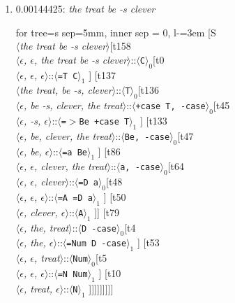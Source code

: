 \documentclass[11pt]{article}
\begin{document}
\begin{enumerate}
	\item  0.00144425: \textit{the treat be -s clever} \\[0.5em]
	\begin{forest}
	for tree={s sep=5mm, inner sep = 0, l-=3em}
	[S\\$\langle$\textit{the treat be -s clever}$\rangle$[t158\\$\langle$\textit{$\epsilon${,} $\epsilon${,} the treat be -s clever}$\rangle$::$\langle$\texttt{C}$\rangle_0$[t0\\$\langle$\textit{$\epsilon${,} $\epsilon${,} $\epsilon$}$\rangle$::$\langle$\texttt{{=}T C}$\rangle_1$ ] [t137\\$\langle$\textit{the treat{,} be -s{,} clever}$\rangle$::$\langle$\texttt{T}$\rangle_0$[t136\\$\langle$\textit{$\epsilon${,} be -s{,} clever{,} the treat}$\rangle$::$\langle$\texttt{+case T{,} -case}$\rangle_0$[t45\\$\langle$\textit{$\epsilon${,} -s{,} $\epsilon$}$\rangle$::$\langle$\texttt{{=}$>$Be +case T}$\rangle_1$ ] [t133\\$\langle$\textit{$\epsilon${,} be{,} clever{,} the treat}$\rangle$::$\langle$\texttt{Be{,} -case}$\rangle_0$[t47\\$\langle$\textit{$\epsilon${,} be{,} $\epsilon$}$\rangle$::$\langle$\texttt{{=}a Be}$\rangle_1$ ] [t86\\$\langle$\textit{$\epsilon${,} $\epsilon${,} clever{,} the treat}$\rangle$::$\langle$\texttt{a{,} -case}$\rangle_0$[t64\\$\langle$\textit{$\epsilon${,} $\epsilon${,} clever}$\rangle$::$\langle$\texttt{{=}D a}$\rangle_0$[t48\\$\langle$\textit{$\epsilon${,} $\epsilon${,} $\epsilon$}$\rangle$::$\langle$\texttt{{=}A {=}D a}$\rangle_1$ ] [t50\\$\langle$\textit{$\epsilon${,} clever{,} $\epsilon$}$\rangle$::$\langle$\texttt{A}$\rangle_1$ ]] [t79\\$\langle$\textit{$\epsilon${,} the{,} treat}$\rangle$::$\langle$\texttt{D -case}$\rangle_0$[t4\\$\langle$\textit{$\epsilon${,} the{,} $\epsilon$}$\rangle$::$\langle$\texttt{{=}Num D -case}$\rangle_1$ ] [t53\\$\langle$\textit{$\epsilon${,} $\epsilon${,} treat}$\rangle$::$\langle$\texttt{Num}$\rangle_0$[t5\\$\langle$\textit{$\epsilon${,} $\epsilon${,} $\epsilon$}$\rangle$::$\langle$\texttt{{=}N Num}$\rangle_1$ ] [t10\\$\langle$\textit{$\epsilon${,} treat{,} $\epsilon$}$\rangle$::$\langle$\texttt{N}$\rangle_1$ ]]]]]]]]]
	\end{forest}
	\newpage


\end{enumerate}
\end{document}
